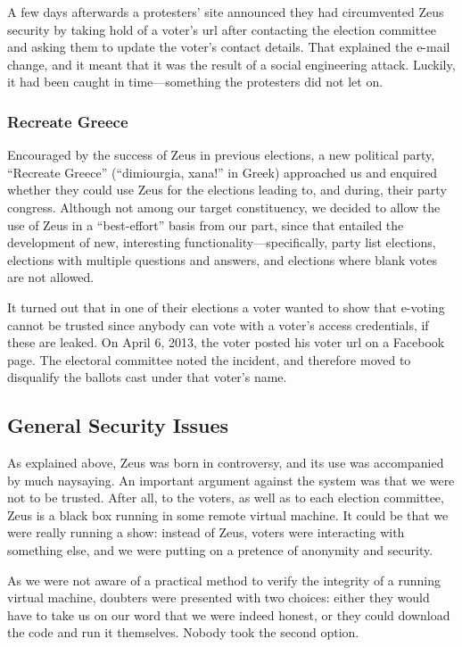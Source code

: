 \documentclass[letterpaper,10pt]{article}
\begin{document}
A few days afterwards a protesters' site announced they had
circumvented Zeus security by taking hold of a voter's {\sc url} after
contacting the election committee and asking them to update the
voter's contact details. That explained the e-mail change, and it
meant that it was the result of a social engineering attack. Luckily,
it had been caught in time---something the protesters did not let on.


\subsubsection{Recreate Greece}

Encouraged by the success of Zeus in previous elections, a new
political party, ``Recreate Greece'' (``dimiourgia, xana!'' in Greek)
approached us and enquired whether they could use Zeus for the
elections leading to, and during, their party congress. Although not
among our target constituency, we decided to allow the use of Zeus in
a ``best-effort'' basis from our part, since that entailed the
development of new, interesting functionality---specifically, party
list elections, elections with multiple questions and answers, and
elections where blank votes are not allowed.

It turned out that in one of their elections a voter wanted to show
that e-voting cannot be trusted since anybody can vote with a voter's
access credentials, if these are leaked. On April 6, 2013, the voter
posted his voter {\sc url} on a Facebook page. The electoral committee noted
the incident, and therefore moved to disqualify the ballots cast under
that voter's name. 

\subsection{General Security Issues}
\label{ssec:security-discussion}

As explained above, Zeus was born in controversy, and its use was
accompanied by much naysaying. An important argument against the
system was that we were not to be trusted. After all, to the voters,
as well as to each election committee, Zeus is a black box running in
some remote virtual machine. It could be that we were really running a
show: instead of Zeus, voters were interacting with something else, and
we were putting on a pretence of anonymity and security. 

As we were not aware of a practical method to verify the integrity of
a running virtual machine, doubters were presented with two choices:
either they would have to take us on our word that we were indeed
honest, or they could download the code and run it themselves. Nobody
took the second option. 
\end{document}
